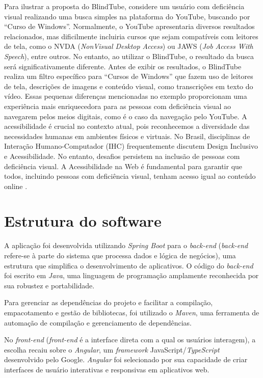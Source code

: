 \documentclass[12pt]{article}
\begin{document}
Para ilustrar a proposta do BlindTube, considere um usuário com deficiência visual realizando uma busca simples na plataforma do YouTube, 
buscando por ``Curso de Windows''. Normalmente, o YouTube apresentaria diversos resultados relacionados, mas dificilmente incluiria cursos que sejam compatíveis com leitores de tela, 
como o NVDA (\textit{NonVisual Desktop Access}) ou JAWS (\textit{Job Access With Speech}), entre outros. No entanto, ao utilizar o BlindTube, o resultado da busca será significativamente diferente. Antes de exibir os resultados, o BlindTube realiza um filtro específico para ``Cursos de Windows'' que fazem uso de leitores de tela, descrições de imagens e conteúdo visual, como transcrições em texto do vídeo. Essas pequenas diferenças mencionadas no exemplo proporcionam uma experiência mais enriquecedora para as pessoas com deficiência visual ao navegarem pelos meios digitais, como é o caso da navegação pelo YouTube.
A acessibilidade é crucial no contexto atual, pois reconhecemos a diversidade das necessidades humanas em ambientes físicos e virtuais. No Brasil, disciplinas de Interação Humano-Computador (IHC) frequentemente discutem Design Inclusivo e Acessibilidade. No entanto, desafios persistem na inclusão de pessoas com deficiência visual. A Acessibilidade na Web é fundamental para garantir que todos, incluindo pessoas com deficiência visual, tenham acesso igual ao conteúdo online \cite{proedad2023}.

\section{Estrutura do software}

A aplicação foi desenvolvida utilizando \textit{Spring Boot} para o \textit{back-end} (\textit{back-end} refere-se à parte do sistema que processa dados e lógica de negócios), uma estrutura que simplifica o desenvolvimento de aplicativos. O código do \textit{back-end} foi escrito em \textit{Java}, uma linguagem de programação amplamente reconhecida por sua robustez e portabilidade.

Para gerenciar as dependências do projeto e facilitar a compilação, empacotamento e gestão de bibliotecas, foi utilizado o \textit{Maven}, uma ferramenta de automação de compilação e gerenciamento de dependências.

No \textit{front-end} (\textit{front-end} é a interface direta com a qual os usuários interagem), a escolha recaiu sobre o \textit{Angular}, um \textit{framework} JavaScript/\textit{TypeScript} desenvolvido pelo Google. \textit{Angular} foi selecionado por sua capacidade de criar interfaces de usuário interativas e responsivas em aplicativos web.
\end{document}
